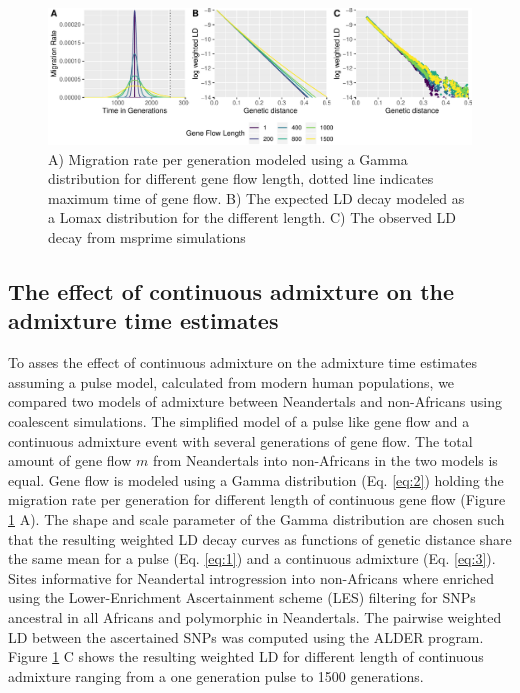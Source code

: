 \documentclass[]{article}
\begin{document}
\begin{figure}
\centering
\includegraphics{Admixture_Time_Inference_Paper_Draft_files/figure-latex/fig1-1.pdf}
\caption{\label{fig:fig1} A) Migration rate per generation modeled using
a Gamma distribution for different gene flow length, dotted line
indicates maximum time of gene flow. B) The expected LD decay modeled as
a Lomax distribution for the different length. C) The observed LD decay
from msprime simulations}
\end{figure}

\subsection{The effect of continuous admixture on the admixture time estimates}\label{the effect of continuous admixture on the admixture time estimates}

To asses the effect of continuous admixture on the admixture
time estimates assuming a pulse model, calculated from modern human populations, we compared two
models of admixture between Neandertals and non-Africans using
coalescent simulations. The simplified model of a pulse like gene flow
and a continuous admixture event with several generations of gene flow.
The total amount of gene flow \(m\) from Neandertals into non-Africans
in the two models is equal. Gene flow is modeled using a Gamma
distribution (Eq. \ref{eq:2}) holding the migration rate per generation
for different length of continuous gene flow (Figure \ref{fig:fig1} A).
The shape and scale parameter of the Gamma distribution are chosen such
that the resulting weighted LD decay curves as functions of genetic
distance share the same mean for a pulse (Eq. \ref{eq:1}) and a
continuous admixture (Eq. \ref{eq:3}). Sites informative for Neandertal
introgression into non-Africans where enriched using the
Lower-Enrichment Ascertainment scheme (LES) filtering for SNPs ancestral in
all Africans and polymorphic in Neandertals. The pairwise weighted LD
between the ascertained SNPs was computed using the ALDER program.
Figure \ref{fig:fig1} C shows the resulting weighted LD for different
length of continuous admixture ranging from a one generation pulse to
1500 generations.
\end{document}

